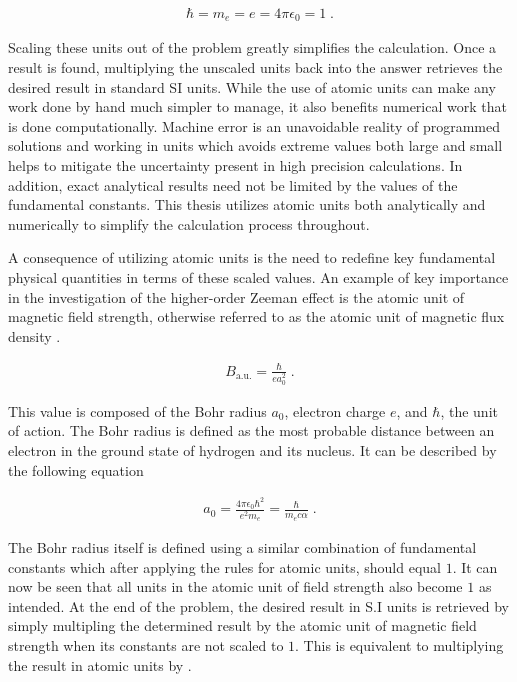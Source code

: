         \begin{align}
            \hbar = m_e = e = 4\pi \epsilon_0 = 1\;.
        \end{align}

        \noindent Scaling these units out of the problem greatly simplifies the calculation. Once a result is found, multiplying the unscaled units back into the answer retrieves the desired result in standard SI units. While the use of atomic units can make any work done by hand much simpler to manage, it also benefits numerical work that is done computationally. Machine error is an unavoidable reality of programmed solutions and working in units which avoids extreme values both large and small helps to mitigate the uncertainty present in high precision calculations. In addition, exact analytical results need not be limited by the values of the fundamental constants. This thesis utilizes atomic units both analytically and numerically to simplify the calculation process throughout.

        A consequence of utilizing atomic units is the need to redefine key fundamental physical quantities in terms of these scaled values. An example of key importance in the investigation of the higher-order Zeeman effect is the atomic unit of magnetic field strength, otherwise referred to as the atomic unit of magnetic flux density \cite{Atomic_unit_of_field_strength}.

        \begin{align}
            B_{\text{a.u.}} = \frac{\hbar}{e a_0^2}\;.
        \end{align}

        \noindent This value is composed of the Bohr radius $a_0$, electron charge $e$, and $\hbar$, the unit of action. The Bohr radius is defined as the most probable distance between an electron in the ground state of hydrogen and its nucleus. It can be described by the following equation \cite{Griffiths_2018}

        \begin{align}
            a_0 = \frac{4\pi \epsilon_0 \hbar^2}{e^2 m_e} = \frac{\hbar}{m_e c \alpha} \label{eq:bohr_radius}\;.
        \end{align}

        \noindent The Bohr radius itself is defined using a similar combination of fundamental constants which after applying the rules for atomic units, should equal $1$. It can now be seen that all units in the atomic unit of field strength also become $1$ as intended. At the end of the problem, the desired result in S.I units is retrieved by simply multipling the determined result by the atomic unit of magnetic field strength when its constants are not scaled to $1$. This is equivalent to multiplying the result in atomic units by \cite{Atomic_unit_of_field_strength}.

